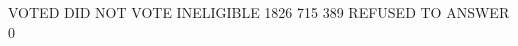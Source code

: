 \begin{Schunk}
\begin{Soutput}
            VOTED      DID NOT VOTE        INELIGIBLE 
             1826               715               389 
REFUSED TO ANSWER 
                0 
\end{Soutput}
\end{Schunk}
